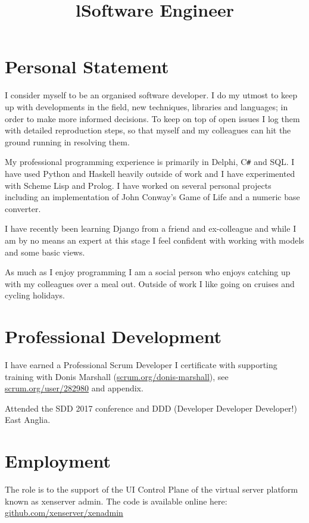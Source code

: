 \documentclass[line,margin]{res}
\title{l} \location{r} \\
\newcommand{\CSharp}{C\texttt{\#}}
\begin{document}
\begin{resume}
\section{Personal Statement}
I consider myself to be an organised software developer.
I do my utmost to keep up with developments in the field, new techniques, libraries and languages; in order to make more informed decisions.
To keep on top of open issues I log them with detailed reproduction steps, so that myself and my colleagues can hit the ground running in resolving them.

My professional programming experience is primarily in Delphi, {\CSharp} and SQL. I have used Python and Haskell heavily outside of work and I have experimented with Scheme Lisp and Prolog.
I have worked on several personal projects including an implementation of John Conway's Game of Life and a numeric base converter.

I have recently been learning Django from a friend and ex-colleague and while I am by no means an expert at this stage I feel confident with working with models and some basic views.

As much as I enjoy programming I am a social person who enjoys catching up with my colleagues over a meal out.
Outside of work I like going on cruises and cycling holidays.

\section{Professional Development}
I have earned a Professional Scrum Developer I certificate with supporting training with Donis Marshall (\href{https://www.scrum.org/donis-marshall}{scrum.org/donis-marshall}), see \href{https://www.scrum.org/user/282980}{scrum.org/user/282980} and appendix.

Attended the SDD 2017 conference and
DDD (Developer Developer Developer!) East Anglia.

\section{Employment}

\title{Software Engineer}
\begin{position}
The role is to the support of the UI Control Plane
of the virtual server platform known as xenserver admin.
The code is available online here:
\href{https://github.com/xenserver/xenadmin}{github.com/xenserver/xenadmin}
\end{position}


\end{resume}
\end{document}
